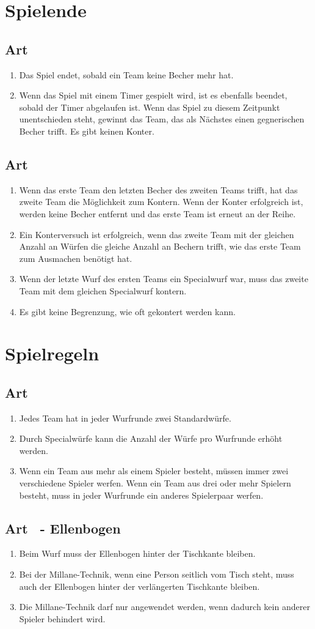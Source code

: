 \documentclass[a4paper,11pt]{scrartcl}
\newcommand{\enum}[1]{\begin{enumerate}[label=(\arabic*)]#1\end{enumerate}}
\newcommand{\art}[2]{\subsection*{#1} \enum{#2}}
\newcounter{art}
\begin{document}
\section{Spielende}
    \art{Art \theart}{
        \item
            Das Spiel endet, sobald ein Team keine Becher mehr hat.
        \item
            Wenn das Spiel mit einem Timer gespielt wird, ist es ebenfalls beendet, sobald der Timer abgelaufen ist. Wenn das Spiel zu diesem Zeitpunkt unentschieden steht, gewinnt das Team, das als Nächstes einen gegnerischen Becher trifft. Es gibt keinen Konter.
    }

    \art{Art \theart}{
        \item
            Wenn das erste Team den letzten Becher des zweiten Teams trifft, hat das zweite Team die Möglichkeit zum Kontern. Wenn der Konter erfolgreich ist, werden keine Becher entfernt und das erste Team ist erneut an der Reihe.
        \item
            Ein Konterversuch ist erfolgreich, wenn das zweite Team mit der gleichen Anzahl an Würfen die gleiche Anzahl an Bechern trifft, wie das erste Team zum Ausmachen benötigt hat.
        \item
            Wenn der letzte Wurf des ersten Teams ein Specialwurf war, muss das zweite Team mit dem gleichen Specialwurf kontern.
        \item
            Es gibt keine Begrenzung, wie oft gekontert werden kann.
    }

\section{Spielregeln}
    \art{Art \theart}{
        \item
            Jedes Team hat in jeder Wurfrunde zwei Standardwürfe.
        \item
            Durch Specialwürfe kann die Anzahl der Würfe pro Wurfrunde erhöht werden.
        \item
            Wenn ein Team aus mehr als einem Spieler besteht, müssen immer zwei verschiedene Spieler werfen. Wenn ein Team aus drei oder mehr Spielern besteht, muss in jeder Wurfrunde ein anderes Spielerpaar werfen.
    }

    \art{Art \theart\ - Ellenbogen}{
        \item
            Beim Wurf muss der Ellenbogen hinter der Tischkante bleiben.
        \item
            Bei der Millane-Technik, wenn eine Person seitlich vom Tisch steht, muss auch der Ellenbogen hinter der verlängerten Tischkante bleiben.
        \item
            Die Millane-Technik darf nur angewendet werden, wenn dadurch kein anderer Spieler behindert wird.
    }
\end{document}
